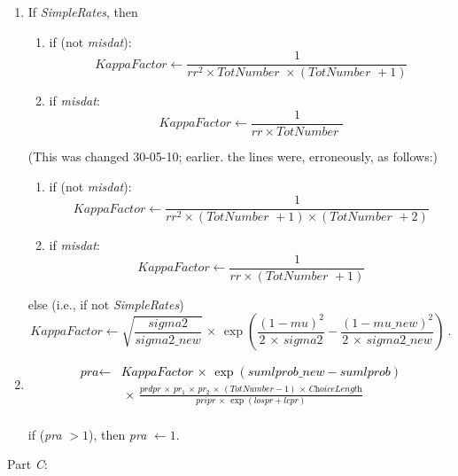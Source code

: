 \documentclass[a4paper,12pt,fleqn]{article}
\newcommand{\ttimes}{\,\times\,}
\newcommand{\ms}{\textsl{\textsf{\small ms}}} %
\newcommand{\addce}[1]{{\textcolor[named]{Black}{#1}}}
\begin{document}
\begin{enumerate}[resume]
\begin{enumerate}
            \textit{StateBefore}$(\ms_b)$ of the current (`old') chain.
      \end{enumerate}
\item If \textit{SimpleRates}, then
      \begin{enumerate}
      \item if (not \textit{misdat}):
        \[
        \textit{KappaFactor} \leftarrow \frac{1}{rr^2
                      \times \textit{TotNumber } \times(\textit{TotNumber } + 1)}
        \]
      \item if \textit{misdat}:
        \[
        \textit{KappaFactor} \leftarrow \frac{1}{rr \times \textit{TotNumber } }
        \]
      \end{enumerate}
(This was changed 30-05-10; earlier. the lines were, erroneously, as follows:)
      \begin{enumerate}
      \item if (not \textit{misdat}):
        \[
        \textit{KappaFactor} \leftarrow \frac{1}{rr^2
                      \times(\textit{TotNumber } + 1) \times(\textit{TotNumber } + 2)}
        \]
      \item if \textit{misdat}:
        \[
        \textit{KappaFactor} \leftarrow \frac{1}{rr \times(\textit{TotNumber } + 1) }
        \]
      \end{enumerate}
      else (i.e., if not \textit{SimpleRates})
      \begin{equation}
      \textit{KappaFactor} \leftarrow \sqrt{ \frac{\textit{sigma2}}{\textit{sigma2\_new}} }
                  \ttimes \exp\left( \frac{\left(1 - \textit{mu} \right)^2}{2\ttimes\textit{sigma2}}
                   - \frac{\left(1 - \textit{mu\_new} \right)^2}{2\ttimes\textit{sigma2\_new}}  \right) \ .
      \end{equation}
\item \addce{
      \begin{align}
     \textit{pra}  \leftarrow &
        \textit{KappaFactor} \ttimes \exp(\textit{sumlprob\_new} - \textit{sumlprob}) \\
      & \ttimes  \frac{prdpr \ttimes pr_1 \ttimes pr_2 \ttimes(\textit{TotNumber}-1)\ttimes \textit{ChoiceLength} }
                     {pripr \ttimes \exp{(lospr + lcpr)}}
    \end{align}
    }\\
    if (\textit{pra} $ > 1$), then  \textit{pra} $ \leftarrow 1 $.
\end{enumerate}
Part \emph{C}:
\end{document}
